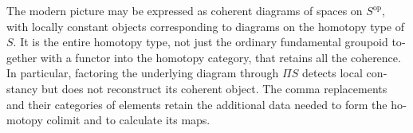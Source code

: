 \begin{otherlanguage}{english}
The modern picture may be expressed as coherent diagrams of spaces on $S^{\mathrm{op}}$, with locally constant objects corresponding to diagrams on the homotopy type of $S$. It is the entire homotopy type, not just the ordinary fundamental groupoid together with a functor into the homotopy category, that retains all the coherence. In particular, factoring the underlying diagram through $\Pi S$ detects local constancy but does not reconstruct its coherent object. The comma replacements and their categories of elements retain the additional data needed to form the homotopy colimit and to calculate its maps.
\endgroup
\end{otherlanguage}
\dgrchunkend
